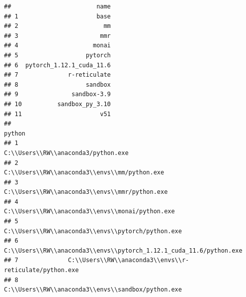 \documentclass[
]{book}
\theoremstyle{definition}
\theoremstyle{definition}
\theoremstyle{definition}
\theoremstyle{definition}
\theoremstyle{remark}
\begin{document}
\begin{verbatim}
##                        name
## 1                      base
## 2                        mm
## 3                       mmr
## 4                     monai
## 5                   pytorch
## 6  pytorch_1.12.1_cuda_11.6
## 7              r-reticulate
## 8                   sandbox
## 9               sandbox-3.9
## 10          sandbox_py_3.10
## 11                      v51
##                                                                 python
## 1                                  C:\\Users\\RW\\anaconda3/python.exe
## 2                        C:\\Users\\RW\\anaconda3\\envs\\mm/python.exe
## 3                       C:\\Users\\RW\\anaconda3\\envs\\mmr/python.exe
## 4                     C:\\Users\\RW\\anaconda3\\envs\\monai/python.exe
## 5                   C:\\Users\\RW\\anaconda3\\envs\\pytorch/python.exe
## 6  C:\\Users\\RW\\anaconda3\\envs\\pytorch_1.12.1_cuda_11.6/python.exe
## 7              C:\\Users\\RW\\anaconda3\\envs\\r-reticulate/python.exe
## 8                   C:\\Users\\RW\\anaconda3\\envs\\sandbox/python.exe

\end{verbatim}
\end{document}

